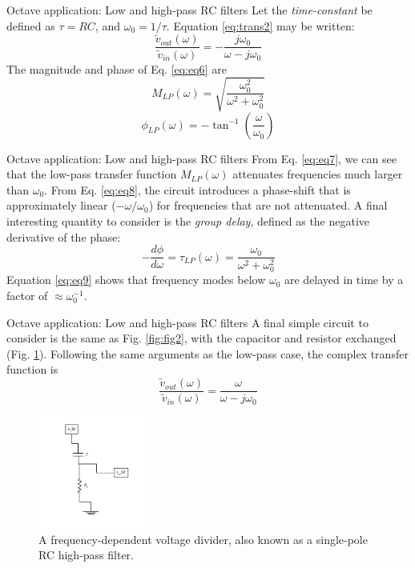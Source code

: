 \documentclass{beamer}
\begin{document}
\begin{frame}{Octave application: Low and high-pass RC filters}
\small
Let the \textit{time-constant} be defined as $\tau = RC$, and $\omega_0 = 1/\tau$.  Equation \ref{eq:trans2} may be written:
\begin{equation}
\frac{\tilde{v}_{out}(\omega)}{\tilde{v}_{in}(\omega)} = -\frac{j\omega_0}{\omega - j\omega_0}
\label{eq:eq6}
\end{equation}
The magnitude and phase of Eq. \ref{eq:eq6} are
\begin{equation}
\boxed{
M_{LP}(\omega) = \sqrt{\frac{\omega_0^2}{\omega^2+\omega_0^2}}
}
\label{eq:eq7}
\end{equation}
\begin{equation}
\boxed{
\phi_{LP}(\omega) = -\tan^{-1}\left(\frac{\omega}{\omega_0}\right)
}
\label{eq:eq8}
\end{equation}
\end{frame}

\begin{frame}{Octave application: Low and high-pass RC filters}
\small
From Eq. \ref{eq:eq7}, we can see that the low-pass transfer function $M_{LP}(\omega)$ attenuates frequencies much larger than $\omega_0$.  From Eq. \ref{eq:eq8}, the circuit introduces a phase-shift that is approximately linear ($-\omega/\omega_0$) for frequencies that are not attenuated.  A final interesting quantity to consider is the \textit{group delay}, defined as the negative derivative of the phase:
\begin{equation}
\boxed{
-\frac{d\phi}{d\omega} = \tau_{LP}(\omega) = \frac{\omega_0}{\omega^2+\omega_0^2}
}
\label{eq:eq9}
\end{equation}
Equation \ref{eq:eq9} shows that frequency modes below $\omega_0$ are delayed in time by a factor of $\approx \omega_0^{-1}$.
\end{frame}

\begin{frame}{Octave application: Low and high-pass RC filters}
\small
A final simple circuit to consider is the same as Fig. \ref{fig:fig2}, with the capacitor and resistor exchanged (Fig. \ref{fig:fig3}).  Following the same arguments as the low-pass case, the complex transfer function is
\begin{equation}
\frac{\tilde{v}_{out}(\omega)}{\tilde{v}_{in}(\omega)} = \frac{\omega}{\omega - j\omega_0}
\label{eq:trans3}
\end{equation}
\begin{figure}
\centering
\includegraphics[width=0.33\textwidth,trim=0cm 1cm 0cm 0cm,clip=true]{figures/HighPass.pdf}
\caption{\label{fig:fig3} A frequency-dependent voltage divider, also known as a single-pole RC high-pass filter.}
\end{figure}
\end{frame}
\end{document}
